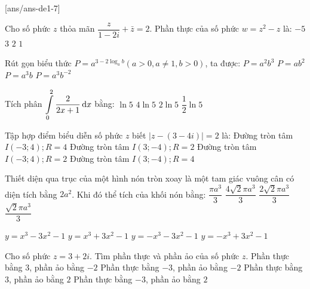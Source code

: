 \begin{name}
	{\tenchude}
	{\tendethi}
	{\tentruong}
	{\thoigian}
\end{name}
[ans/ans-de1-7]

\begin{ex}%
Cho số phức $z$ thỏa mãn $\dfrac{z}{1-2 i}+\bar{z}=2$. Phần thực của số phức $w=z^2-z$ là:
\choice
{$-5$}
{$3$}
{$2$}
{\True $1$}

\end{ex}
\begin{ex}%
Rút gọn biểu thức $P=a^{3-2\log_a b}(a>0, a \neq 1, b>0)$, ta được:
\choice
{$P=a^2 b^3$}
{$P=a b^2$}
{$P=a^3 b$}
{\True $P=a^3 b^{-2}$}

\end{ex}
\begin{ex}%
Tích phân $\displaystyle\displaystyle\int\limits_0^2 \dfrac{2}{2 x+1} \mathrm{\,d} x$ bằng:
\choice
{\True $\ln 5$}
{$4\ln 5$}
{$2\ln 5$}
{$\dfrac{1}{2} \ln 5$}

\end{ex}
\begin{ex}%
Tập hợp điểm biểu diễn số phức $z$ biết $|z-(3-4 i)|=2$ là:
\choice
{Đường tròn tâm $I(-3; 4); R=4$}
{\True Đường tròn tâm $I(3;-4); R=2$}
{Đường tròn tâm $I(-3; 4); R=2$}
{Đường tròn tâm $I(3;-4); R=4$}

\end{ex}
\begin{ex}%
Thiết diện qua trục của một hình nón tròn xoay là một tam giác vuông cân có diện tích bằng $2 a^2$. Khi đó thể tích của khối nón bằng:
\choice
{$\dfrac{\pi a^3}{3}$}
{$\dfrac{4\sqrt{2} \pi a^3}{3}$}
{\True $\dfrac{2\sqrt{2} \pi a^3}{3}$}
{$\dfrac{\sqrt{2} \pi a^3}{3}$}

\end{ex}
\begin{ex}%
{
}
\choice
{$y=x^3-3 x^2-1$}
{$y=x^3+3 x^2-1$}
{$y=-x^3-3 x^2-1$}
{\True $y=-x^3+3 x^2-1$}
\end{ex}
\begin{ex}%
Cho số phức $z=3+2 i$. Tìm phần thực và phần ảo của số phức $z$.
\choice
{Phần thực bằng $3$, phần ảo bằng $-2$}
{Phần thực bằng $-3$, phần ảo bằng $-2$}
{\True Phần thực bằng $3$, phần ảo bằng $2$}
{Phần thực bằng $-3$, phần ảo bằng $2$}

\end{ex}
